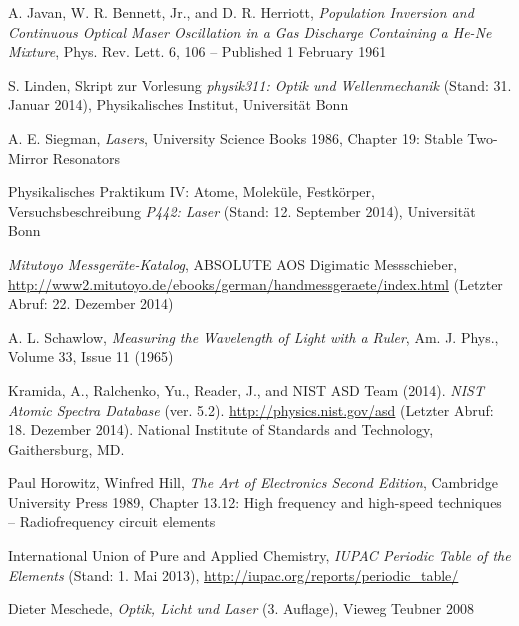 \documentclass[11pt, a4paper]{article}
\numberwithin{equation}{section}
\begin{document}
\clearpage
\vspace{\fill}
\begin{thebibliography}{19}
	A. Javan, W. R. Bennett, Jr., and D. R. Herriott,
	\emph{Population Inversion and Continuous Optical Maser Oscillation in a Gas Discharge Containing a He-Ne Mixture},
	Phys. Rev. Lett. 6, 106 – Published 1 February 1961

	S. Linden,
	Skript zur Vorlesung \emph{physik311: Optik und Wellenmechanik} (Stand: 31. Januar 2014),
	Physikalisches Institut, Universität Bonn

	A. E. Siegman,
	\emph{Lasers},
	University Science Books 1986,
	Chapter 19: Stable Two-Mirror Resonators

	Physikalisches Praktikum IV: Atome, Moleküle, Festkörper,
	Versuchsbeschreibung \emph{P442: Laser} (Stand: 12. September 2014),
	Universität Bonn
	
	\emph{Mitutoyo Messgeräte-Katalog},
	ABSOLUTE AOS Digimatic Messschieber,\\
	\url{http://www2.mitutoyo.de/ebooks/german/handmessgeraete/index.html} (Letzter Abruf: 22. Dezember 2014)	

	A. L. Schawlow,
	\emph{Measuring the Wavelength of Light with a Ruler},
	Am. J. Phys., Volume 33, Issue 11 (1965)

	Kramida, A., Ralchenko, Yu., Reader, J., and NIST ASD Team (2014).
	\emph{NIST Atomic Spectra Database} (ver. 5.2).
	\url{http://physics.nist.gov/asd} (Letzter Abruf: 18. Dezember 2014).
	National Institute of Standards and Technology, Gaithersburg, MD.
	
	Paul Horowitz, Winfred Hill,
	\emph{The Art of Electronics Second Edition},
	Cambridge University Press 1989,
	Chapter 13.12: High frequency and high-speed techniques -- Radiofrequency circuit elements

	International Union of Pure and Applied Chemistry,
	\emph{IUPAC Periodic Table of the Elements} (Stand: 1. Mai 2013),
	\url{http://iupac.org/reports/periodic_table/}

	Dieter Meschede,
	\emph{Optik, Licht und Laser} (3. Auflage),
	Vieweg Teubner 2008
	
	
 
\end{thebibliography}
\end{document}
